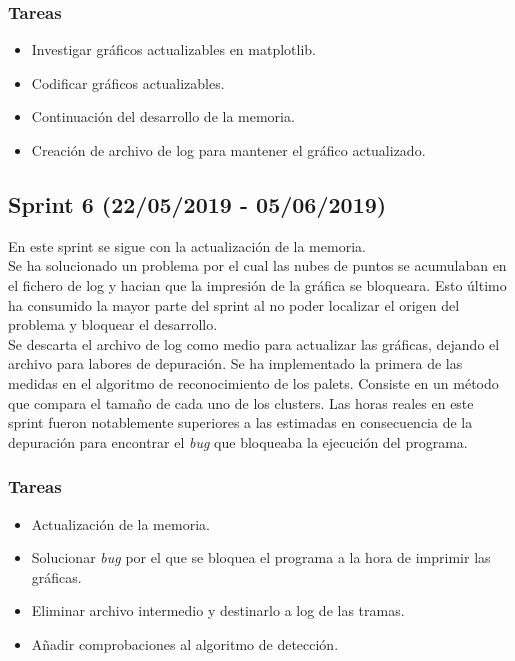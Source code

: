 \subsubsection{Tareas}
\begin{itemize}
\item Investigar gráficos actualizables en matplotlib. 
\item Codificar gráficos actualizables.
\item Continuación del desarrollo de la memoria.
\item Creación de archivo de log para mantener el gráfico actualizado.

\end{itemize}


\subsection{Sprint 6 (22/05/2019 - 05/06/2019)}
En este sprint se sigue con la actualización de la memoria.\\ Se ha solucionado un problema por el cual las nubes de puntos se acumulaban en el fichero de log y hacian que la impresión de la gráfica se bloqueara. Esto último ha consumido la mayor parte del sprint al no poder localizar el origen del problema y bloquear el desarrollo.\\
Se descarta el archivo de log como medio para actualizar las gráficas, dejando el archivo para labores de depuración. Se ha implementado la primera de las medidas en el algoritmo de reconocimiento de los palets. Consiste en un método que compara el tamaño de cada uno de los clusters. Las horas reales en este sprint fueron notablemente superiores a las estimadas en consecuencia de la depuración para encontrar el \textit{bug} que bloqueaba la ejecución del programa.




\subsubsection{Tareas}
\begin{itemize}
\item Actualización de la memoria.
\item Solucionar \textit{bug} por el que se bloquea el programa a la hora de imprimir las gráficas.
\item Eliminar archivo intermedio y destinarlo a log de las tramas.
\item Añadir comprobaciones al algoritmo de detección.

\end{itemize}


